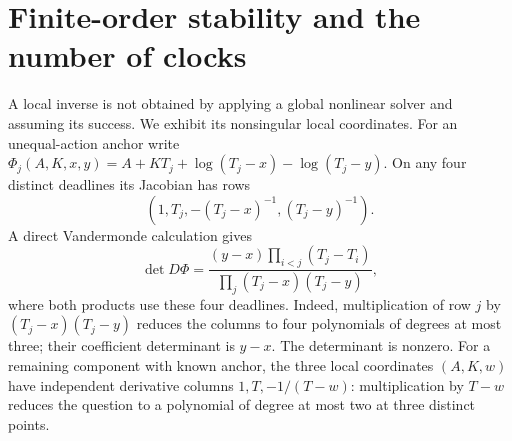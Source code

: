 \section{Finite-order stability and the number of clocks}
\label{sec:v82-stability}

A local inverse is not obtained by applying a global nonlinear solver
and assuming its success. We exhibit its nonsingular local coordinates.
For an unequal-action anchor write
$\Phi_j(A,K,x,y)=A+KT_j+\log(T_j-x)-\log(T_j-y)$.
On any four distinct deadlines its Jacobian has rows
\[
                    (1,T_j,-(T_j-x)^{-1},(T_j-y)^{-1}).
\]
A direct Vandermonde calculation gives
\begin{equation}\label{eq:v82-jacobian}
 \det D\Phi=
 \frac{(y-x)\prod_{i<j}(T_j-T_i)}
      {\prod_j(T_j-x)(T_j-y)},
\end{equation}
where both products use these four deadlines. Indeed, multiplication
of row $j$ by $(T_j-x)(T_j-y)$ reduces the columns to four polynomials
of degrees at most three; their coefficient determinant is $y-x$.
The determinant is nonzero. For a remaining component with known anchor,
the three local coordinates $(A,K,w)$ have independent derivative
columns $1,T,-1/(T-w)$: multiplication by $T-w$ reduces the question
to a polynomial of degree at most two at three distinct points.

